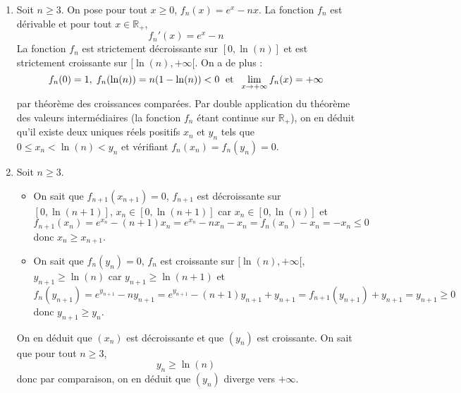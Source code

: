 \documentclass[a4paper,10pt]{report}
\begin{document}
\corr \begin{enumerate}
\item Soit $n \geq 3$. On pose pour tout $x \geq 0$, $f_n(x)=e^x-nx$. La fonction $f_n$ est dérivable et pour tout $x \in \mathbb{R}_+$,
$$ f_n'(x)=e^x-n$$
La fonction $f_n$ est strictement décroissante sur $[0, \ln(n)]$ et est strictement croissante sur $[\ln(n), + \infty[$. On a de plus :
$$ f_n(0)=1, \; f_n(\ln(n))=n(1- \ln(n))<0 \; \hbox{ et } \; \lim_{x \rightarrow + \infty} f_n(x) = + \infty$$
par théorème des croissances comparées. Par double application du théorème des valeurs intermédiaires (la fonction $f_n$ étant continue sur $\mathbb{R}_+$), on en déduit qu'il existe deux uniques réels positifs $x_n$ et $y_n$ tels que $0 \leq x_n < \ln(n) < y_n$ et vérifiant $f_n(x_n)=f_n(y_n)=0$.
\item Soit $n \geq 3$.
\begin{itemize}
\item On sait que $f_{n+1}(x_{n+1})=0$, $f_{n+1}$ est décroissante sur $[0, \ln(n+1)]$, $x_n \in [0, \ln(n+1)]$ car $x_n \in [0, \ln(n)]$ et 
$$ f_{n+1}(x_n) = e^{x_n} - (n+1)x_n = e^{x_n} - nx_n - x_n = f_n(x_n)- x_n = -x_n \leq 0$$
donc $x_n \geq x_{n+1}$.
\item On sait que $f_{n}(y_{n})=0$, $f_{n}$ est croissante sur $[\ln(n), + \infty[$, $y_{n+1} \geq \ln(n)$ car $y_{n+1} \geq \ln(n+1)$ et 
$$ f_{n}(y_{n+1}) = e^{y_{n+1}} - ny_{n+1} = e^{y_{n+1}}-(n+1)y_{n+1} + y_{n+1} = f_{n+1}(y_{n+1})+y_{n+1}= y_{n+1} \geq 0$$
donc $y_{n+1} \geq y_n$.
\end{itemize}
On en déduit que $(x_n)$ est décroissante et que $(y_n)$ est croissante. On sait que pour tout $n \geq 3$,
$$ y_n \geq \ln(n)$$
donc par comparaison, on en déduit que $(y_n)$ diverge vers $+ \infty$. 

\medskip


\end{enumerate}
\end{document}
